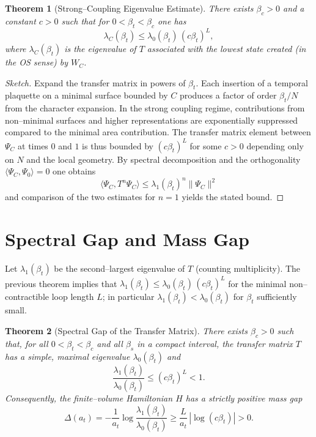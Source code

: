 \documentclass[11pt]{article}
\newtheorem{theorem}{Theorem}[section]
\begin{document}
\begin{theorem}[Strong--Coupling Eigenvalue Estimate]
There exists $\beta_c>0$ and a constant $c>0$ such that for
$0<\beta_t<\beta_c$ one has
\begin{equation}
  \lambda_C(\beta_t) \le \lambda_0(\beta_t)\,(c\beta_t)^L,
\end{equation}
where $\lambda_C(\beta_t)$ is the eigenvalue of $T$ associated with the
lowest state created (in the OS sense) by $W_C$.
\end{theorem}

\begin{proof}[Sketch]
Expand the transfer matrix in powers of $\beta_t$. Each insertion of a
temporal plaquette on a minimal surface bounded by $C$ produces a factor
of order $\beta_t/N$ from the character expansion. In the strong coupling
regime, contributions from non--minimal surfaces and higher
representations are exponentially suppressed compared to the minimal area
contribution. The transfer matrix element between $\Psi_C$ at times $0$
and $1$ is thus bounded by $(c\beta_t)^L$ for some $c>0$ depending only
on $N$ and the local geometry. By spectral decomposition and the
orthogonality $\langle \Psi_C,\Psi_0\rangle=0$ one obtains
\begin{equation}
  \langle \Psi_C, T^n \Psi_C\rangle
  \le \lambda_1(\beta_t)^n \|\Psi_C\|^2
\end{equation}
and comparison of the two estimates for $n=1$ yields the stated bound.
\end{proof}

\section{Spectral Gap and Mass Gap}

Let $\lambda_1(\beta_t)$ be the second--largest eigenvalue of $T$
(counting multiplicity). The previous theorem implies that
$\lambda_1(\beta_t)\le \lambda_0(\beta_t)\,(c\beta_t)^L$ for the minimal
non--contractible loop length $L$; in particular
$\lambda_1(\beta_t)<\lambda_0(\beta_t)$ for $\beta_t$ sufficiently small.

\begin{theorem}[Spectral Gap of the Transfer Matrix]
There exists $\beta_c>0$ such that, for all $0<\beta_t<\beta_c$ and all
$\beta_s$ in a compact interval, the transfer matrix $T$ has a simple,
maximal eigenvalue $\lambda_0(\beta_t)$ and
\begin{equation}
  \frac{\lambda_1(\beta_t)}{\lambda_0(\beta_t)}
  \le (c\beta_t)^L < 1.
\end{equation}
Consequently, the finite--volume Hamiltonian $H$ has a strictly positive
mass gap
\begin{equation}
  \Delta(a_t) = -\frac{1}{a_t}\log\frac{\lambda_1(\beta_t)}{\lambda_0(\beta_t)}
  \ge \frac{L}{a_t}\,|\log(c\beta_t)| > 0.
\end{equation}
\end{theorem}
\end{document}
